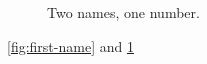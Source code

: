\documentclass{article}
\begin{document}
\begin{figure}[!b]
\centering
{}
\caption{Two names, one number.}
\label{fig:first-name}
\label{packet:second-name}
\end{figure}
\ref{fig:first-name} and \ref{packet:second-name}
\end{document}
